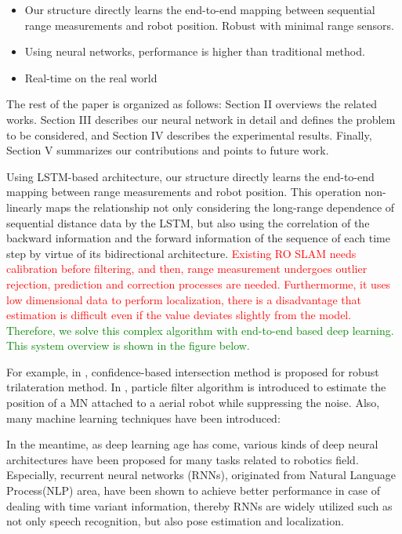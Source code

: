 \documentclass[letterpaper, 10 pt, conference]{ieeeconf}  %
\begin{document}
\begin{itemize}
	\item Our structure directly learns the end-to-end mapping between sequential range measurements and robot position. Robust with minimal range sensors.
	\item Using neural networks, performance is higher than traditional method.
	\item Real-time on the real world
	 
\end{itemize}

The rest of the paper is organized as follows: Section II overviews the related works. Section III describes our neural network in detail and defines the problem to be considered, and Section IV describes the experimental results. Finally, Section V summarizes our contributions and points to future work.


 Using LSTM-based architecture, our structure directly learns the end-to-end mapping between range measurements and robot position. This operation non-linearly maps the relationship not only considering the long-range dependence of sequential distance data by the LSTM, but also using the correlation of the backward information and the forward information of the sequence of each time step by virtue of its bidirectional architecture. \textcolor{red}{Existing RO SLAM needs calibration before filtering, and then, range measurement undergoes outlier rejection, prediction and correction processes are needed.	Furthermorme, it uses low dimensional data to perform localization, there is a disadvantage that estimation is difficult even if the value deviates slightly from the model.} \textcolor{green}{Therefore, we solve this complex algorithm with end-to-end based deep learning. This system overview is shown in the figure below.}




For example, in \cite{li2017novel}, confidence-based intersection method is proposed for robust trilateration method. In \cite{caballero2008particle}, particle filter algorithm is introduced to estimate the position of a MN attached to a aerial robot while suppressing the noise. Also, many machine learning techniques have been introduced: 


In the meantime, as deep learning age has come\cite{lecun2015deep}, various kinds of deep neural architectures have been proposed for many tasks related to robotics field. Especially, recurrent neural networks (RNNs), originated from Natural Language Process(NLP) area\cite{elman1990finding}, have been shown to achieve better performance in case of dealing with time variant information, thereby RNNs are widely utilized such as not only speech recognition, but also pose estimation and localization\cite{walch2017image, gladh2016deep, wang2017deepvo, kendall2015posenet, turan2018deep}. 
\end{document}
